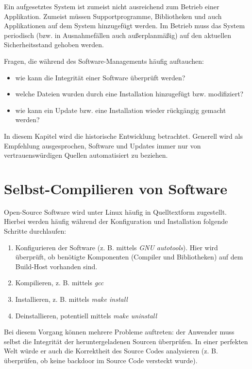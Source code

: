 Ein aufgesetztes System ist zumeist nicht ausreichend zum Betrieb einer Applikation. Zumeist müssen Supportprogramme, Bibliotheken und auch Applikationen auf dem System hinzugefügt werden. Im Betrieb muss das System periodisch (bzw. in Ausnahmefällen auch außerplanmäßig) auf den aktuellen Sicherheitsstand gehoben werden.

Fragen, die während des Software-Managements häufig auftauchen:

\begin{itemize}
	\item wie kann die Integrität einer Software überprüft werden?
	\item welche Dateien wurden durch eine Installation hinzugefügt bzw. modifiziert?
	\item wie kann ein Update bzw. eine Installation wieder rückgängig gemacht werden?
\end{itemize}

In diesem Kapitel wird die historische Entwicklung betrachtet. Generell wird als Empfehlung ausgesprochen, Software und Updates immer nur von vertrauenswürdigen Quellen automatisiert zu beziehen.

\section{Selbst-Compilieren von Software}

Open-Source Software wird unter Linux häufig in Quelltextform zugestellt. Hierbei werden häufig während der Konfiguration und Installation folgende Schritte durchlaufen:

\begin{enumerate}
	\item Konfigurieren der Software (z. B. mittels \textit{GNU autotools}). Hier wird überprüft, ob benötigte Komponenten (Compiler und Bibliotheken) auf dem Build-Host vorhanden sind.
	\item Kompilieren, z. B. mittels \textit{gcc}
	\item Installieren, z. B. mittels \textit{make install}
	\item Deinstallieren, potentiell mittels \textit{make uninstall}
\end{enumerate}

Bei diesem Vorgang können mehrere Probleme auftreten: der Anwender muss selbst die Integrität der heruntergeladenen Sourcen überprüfen. In einer perfekten Welt würde er auch die Korrektheit des Source Codes analysieren (z. B. überprüfen, ob keine backdoor im Source Code versteckt wurde).

